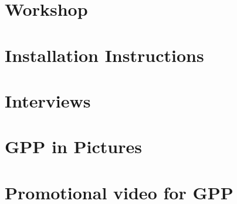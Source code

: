  \appendix

\chapter{Workshop}


\chapter{Installation Instructions}


\chapter{Interviews}


\chapter{GPP in Pictures}


\chapter{Promotional video for GPP}

